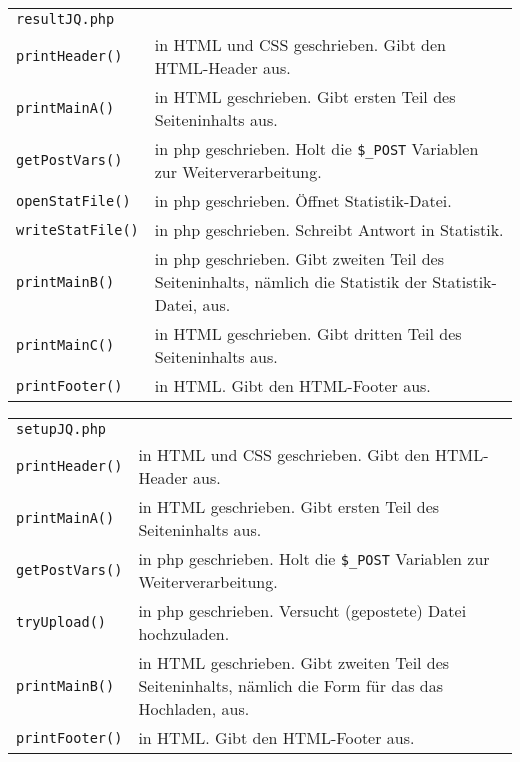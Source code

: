 \documentclass{scrartcl}
\begin{document}
\begin{center}
\begin{tabular}{|p{}|>{\footnotesize} p{}}
\cline{1-1}
\lstinline`resultJQ.php` & \\\cline{1-1}
\lstinline`printHeader()` & in HTML und CSS geschrieben. Gibt den HTML-Header aus.\\
\lstinline`printMainA()` & in HTML geschrieben. Gibt ersten Teil des Seiteninhalts aus. \\
\lstinline`getPostVars()` & in php geschrieben. Holt die \lstinline`$_POST` Variablen zur Weiterverarbeitung.\\
\lstinline`openStatFile()` & in php geschrieben. Öffnet Statistik-Datei. \\
\lstinline`writeStatFile()` & in php geschrieben. Schreibt Antwort in Statistik. \\
\lstinline`printMainB()` & in php geschrieben. Gibt zweiten Teil des Seiteninhalts, nämlich die Statistik der Statistik-Datei, aus. \\
\lstinline`printMainC()` & in HTML geschrieben. Gibt dritten Teil des Seiteninhalts aus. \\
\lstinline`printFooter()` & in HTML. Gibt den HTML-Footer aus.\\
\cline{1-1}
\end{tabular}
\end{center}

\begin{center}
\begin{tabular}{|p{.35\textwidth}|>{\footnotesize} p{.55\textwidth}}
\cline{1-1}
\lstinline`setupJQ.php` & \\\cline{1-1}
\lstinline`printHeader()` & in HTML und CSS geschrieben. Gibt den HTML-Header aus.\\
\lstinline`printMainA()` & in HTML geschrieben. Gibt ersten Teil des Seiteninhalts aus. \\
\lstinline`getPostVars()` & in php geschrieben. Holt die \lstinline`$_POST` Variablen zur Weiterverarbeitung.\\
\lstinline`tryUpload()` & in php geschrieben. Versucht (gepostete) Datei hochzuladen. \\
\lstinline`printMainB()` & in HTML geschrieben. Gibt zweiten Teil des Seiteninhalts, nämlich die Form für das das Hochladen, aus. \\
\lstinline`printFooter()` & in HTML. Gibt den HTML-Footer aus.\\
\cline{1-1}
\end{tabular}
\end{center}
\end{document}
